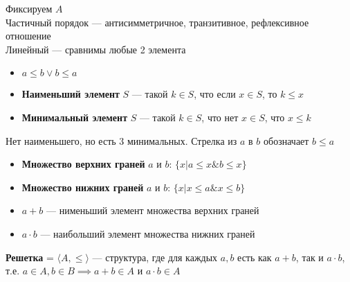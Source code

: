 \documentclass[english]{article}
\begin{document}
\begin{definition}
	Фиксируем \(A\) \\
	Частичный порядок --- антисимметричное, транзитивное, рефлексивное отношение \\
	Линейный --- сравнимы любые 2 элемента \\
	\begin{itemize}
		\item \(a \le b \vee b \le a\)
		\item \textbf{Наименьший элемент} \(S\) --- такой \(k \in S\), что если \(x \in S\), то \(k \le x\)
		\item \textbf{Минимальный элемент} \(S\) --- такой \(k \in S\), что нет \(x \in S\), что \(x \le k\)
	\end{itemize}
	\label{org5d25b02}
\end{definition}
\begin{examp}
	\-
	\begin{center}
	\end{center}
	Нет наименьшего, но есть 3 минимальных. Стрелка из \(a\) в \(b\) обозначает \(b \le a\)
\end{examp}
\begin{definition}
	\-
	\begin{itemize}
		\item \textbf{Множество верхних граней} \(a\) и \(b\): \(\{x \big| a \le x \& b \le x\}\)
		\item \textbf{Множество нижних граней} \(a\) и \(b\): \(\{x \big| x \le a \& x \le b\}\)
	\end{itemize}
	\label{org05aaaed}
\end{definition}
\begin{definition}
	\-
	\begin{itemize}
		\item \textbf{\(a + b\)} --- нименьший элемент множества верхних граней
		\item \textbf{\(a \cdot b\)} --- наибольший элемент множества нижних граней
	\end{itemize}
	\label{orgb717294}
\end{definition}
\begin{definition}
	\textbf{Решетка} = \(\langle A, \le \rangle\) --- структура, где для каждых \(a, b\) есть как \(a + b\), так и \(a \cdot b\), \\
	т.е. \(a \in A, b \in B \implies a + b \in A\) и \(a \cdot b \in A\)
	\label{org98817ef}
\end{definition}
\end{document}
